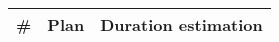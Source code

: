 \begin{longtable}{cXc}
\toprule
\textbf{\#} & \textbf{Plan} & \textbf{Duration estimation} 

\\ \bottomrule
\end{longtable}
